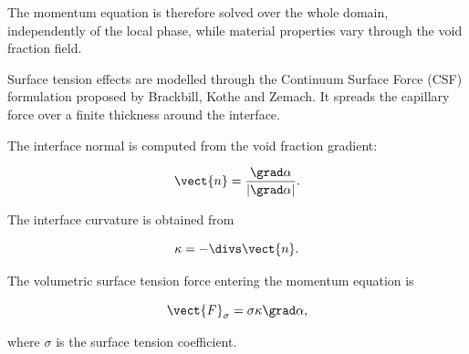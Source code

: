 The momentum equation is therefore solved over the whole domain,
independently of the local phase, while material properties vary through
the void fraction field.

Surface tension effects are modelled through the Continuum Surface Force (CSF)
formulation proposed by Brackbill, Kothe and Zemach. It spreads the capillary
force over a finite thickness around the interface.

The interface normal is computed from the void fraction gradient:

\begin{equation}
\vect{n}=\frac{\grad \alpha}{\left| \grad \alpha \right|}.
\label{eq:vof:normal}
\end{equation}

The interface curvature is obtained from

\begin{equation}
\kappa=-\divs \vect{n}.
\label{eq:vof:curvature}
\end{equation}

The volumetric surface tension force entering the momentum equation is

\begin{equation}
\vect{F}_{\sigma}=\sigma \kappa \grad \alpha,
\label{eq:vof:csf}
\end{equation}

where $\sigma$ is the surface tension coefficient.
